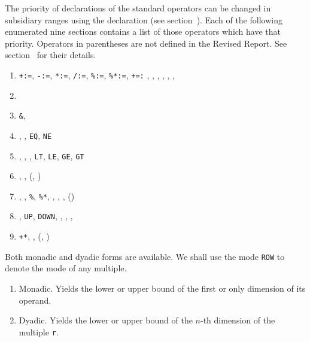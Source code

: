The priority of declarations of the standard operators can be changed
in subsidiary ranges using the 
declaration (see section~). Each of the following
enumerated nine sections contains a list of those operators which
have that priority.  Operators in parentheses are not defined in the
Revised Report. See section~ for their details.
\goodbreak
\begin{enumerate}
\item \verb|+:=|, \verb|-:=|, \verb|*:=|, \verb|/:=|,
\verb|%:=|, \verb|%*:=|, \verb|+=:|\newline
{}, , , ,
, , 
\item {}
\item \verb|&|, 
\item \ixtt{=}, \ixtt{/=}, \verb|EQ|, \verb|NE|
\item \ixtt{<}, \ixtt{<=}, \ixtt{>=}, \ixtt{>} \newline
\verb|LT|, \verb|LE|, \verb|GE|, \verb|GT|
\item \ixtt{-}, \ixtt{+}, (, )
\item \ixtt{*}, \ixtt{/}, \verb|%|, \verb|%*|,\newline
{}, , , ()
\item \ixtt{**}, \verb|UP|, \verb|DOWN|, ,
, , 
\item \verb|+*|, , (, )
\end{enumerate}

Both monadic and dyadic forms are available. We shall use the mode
\verb|ROW| to denote the mode of any multiple.
\begin{enumerate}
\item Monadic.\newline
{}\newline
{}\newline
Yields the lower or upper bound of the first or only dimension of its
operand.
\item Dyadic.\newline
{}\newline
{}\newline
Yields the lower or upper bound of the $n$-th dimension of the
multiple \verb|r|.
\end{enumerate}

